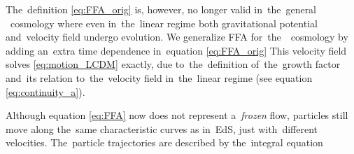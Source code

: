 
The~definition \eqref{eq:FFA_orig} is, however, no longer valid in~the~general \LCDM\ cosmology where even in~the~linear regime both gravitational potential and~velocity field undergo evolution. We generalize FFA for~the~\LCDM\ cosmology by adding an~extra time dependence in~equation \eqref{eq:FFA_orig}
This velocity field solves \eqref{eq:motion_LCDM} exactly, due to~the~definition of~the~growth factor and~its relation to~the~velocity field in~the~linear regime (see equation \eqref{eq:continuity_a}).

Although equation \eqref{eq:FFA} now does not represent a~\textit{frozen} flow, particles still move along the~same characteristic curves as in~EdS, just with~different velocities. The~particle trajectories are described by the~integral equation

